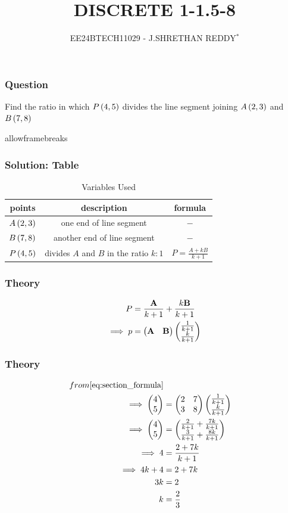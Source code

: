 \documentclass{beamer}
\begin{document}
\title{DISCRETE 1-1.5-8}
\author{EE24BTECH11029 - J.SHRETHAN REDDY$^{*}$}
\date{}
\frame{\titlepage}

\begin{frame}
\frametitle{Question}
Find the ratio in which $P\left(4,5\right)$ divides the line segment joining $A\left(2,3\right)$ and $B\left(7,8\right)$
\end{frame}
\begin{frame}{allowframebreaks}
\frametitle{Solution: Table}
\begin{table}[h!!]
    \centering
    \begin{tabular}{|c|c|c|}
\hline
\textbf{points}& \textbf{description}& \textbf{formula}
\\\hline
$A\left(2,3\right)$&one end of line segment&$-$
\\\hline
$B\left(7,8\right)$&another end of line segment&$-$
\\\hline
$P\left(4,5\right)$&divides $A$ and $B$ in the ratio $k:1$&$P=\frac{A+kB}{k+1}$
\\\hline
\end{tabular}
    \caption{Variables Used}
    \label{tab 10.5.4.5}
\end{table}
\end{frame}
\begin{frame}
\frametitle{Theory}
\begin{align}
 P&=\frac{\vec{A}}{k+1}+\frac{k\vec{B}}{k+1}\\
\label{eq:section_formula}
\implies p&=\myvec{\Vec{A}&\Vec{B}}\myvec{\frac{1}{k+1}\\\frac{k}{k+1}}
\end{align}
\end{frame}
\begin{frame}
\frametitle{Theory}
\begin{align}
 from \eqref{eq:section_formula}\\
 \implies\begin{pmatrix}4\\5\end{pmatrix}&=\begin{pmatrix}2&7\\3&8\end{pmatrix}\begin{pmatrix}\frac{1}{k+1}\\\frac{k}{k+1}\end{pmatrix}\\
\implies \begin{pmatrix}4\\5\end{pmatrix}&=\begin{pmatrix}\frac{2}{k+1}+\frac{7k}{k+1}\\\frac{3}{k+1}+\frac{8k}{k+1}\end{pmatrix}\\
\implies 4&=\frac{2+7k}{k+1}\\
\implies 4k+4&=2+7k\\
3k&=2\\
k&=\frac{2}{3}\\
\end{align}
\end{frame}
\end{document}
